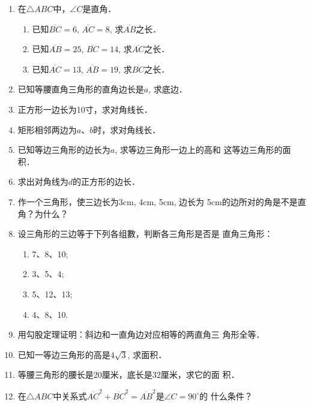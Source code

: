 \begin{ex}
\begin{enumerate}
    \item 在$\triangle ABC$中，$\angle C$是直角．
    \begin{enumerate}
        \item 已知$\overline{BC}=6$, $\overline{AC}=8$, 求$\overline{AB}$之长．
        \item 已知$\overline{AB}=25$, $\overline{BC}=14$, 求$\overline{AC}$之长．
        \item 已知$\overline{AC}=13$, $\overline{AB}=19$, 求$\overline{BC}$之长．
    \end{enumerate}
    
    
    \item 已知等腰直角三角形的直角边长是$a$, 求底边．
    \item 正方形一边长为10寸，求对角线长．
    \item 矩形相邻两边为$a$、$b$时，求对角线长．
    \item 已知等边三角形的边长为$a$, 求等边三角形一边上的高和
    这等边三角形的面积．
    \item 求出对角线为$d$的正方形的边长．
    \item 作一个三角形，使三边长为3cm, 4cm, 5cm, 边长为
    5cm的边所对的角是不是直角？为什么？
    \item 设三角形的三边等于下列各组數，判断各三角形是否是
    直角三角形：
\begin{multicols}{2}
    \begin{enumerate}
        \item 7、8、10;
        \item 3、5、4;
        \item 5、12、13;
        \item 4、8、10.
    \end{enumerate}
\end{multicols}
    \item 用勾股定理证明：斜边和一直角边对应相等的两直角三
    角形全等．
    \item 已知一等边三角形的高是$4\sqrt{3}$, 求面积．
    \item 等腰三角形的腰长是20厘米，底长是32厘米，求它的面
    积．
    \item 在$\triangle ABC$中关系式$\overline{AC}^2+\overline{BC}^2=\overline{AB}^2$是$\angle C=90^{\circ}$的
    什么条件？
\end{enumerate}
\end{ex}

